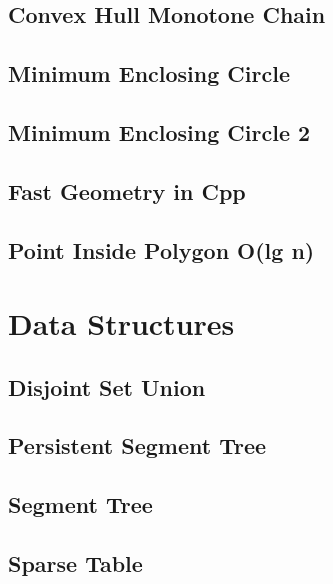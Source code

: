 \subsection{Convex Hull Monotone Chain}
\raggedbottom
\hrulefill
\subsection{Minimum Enclosing Circle}
\raggedbottom
\hrulefill
\subsection{Minimum Enclosing Circle 2}
\raggedbottom
\hrulefill
\subsection{Fast Geometry in Cpp}
\raggedbottom
\hrulefill
\subsection{Point Inside Polygon O(lg n)}
\raggedbottom
\hrulefill

\section{Data Structures}
\subsection{Disjoint Set Union}
\raggedbottom
\hrulefill
\subsection{Persistent Segment Tree}
\raggedbottom
\hrulefill
\subsection{Segment Tree}
\raggedbottom
\hrulefill
\subsection{Sparse Table}
\raggedbottom
\hrulefill
